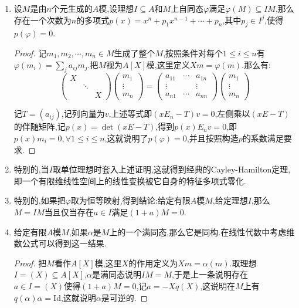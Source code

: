 \begin{enumerate}
	\item 设$M$是由$n$个元生成的$A$模,设理想$I\subseteq A$和$M$上自同态$\varphi$满足$\varphi(M)\subseteq IM$,那么存在一个次数为$n$的多项式$p(x)=x^n+p_1x^{n-1}+\cdots+p_n$,其中$p_j\in I^j$,使得$p(\varphi)=0$.
	\begin{proof}
		
		记$m_1,m_2,\cdots,m_n\in M$生成了整个$M$,按照条件对每个$1\le i\le n$有$\varphi(m_i)=\sum_ja_{ij}m_j$.把$M$视为$A[X]$模,这里定义$Xm=\varphi(m)$.那么有:
		$$\left(\begin{array}{ccc}X&&\\&\ddots&\\&&X\end{array}\right)
		\left(\begin{array}{c}m_1\\\vdots\\m_n\end{array}\right)
		=\left(\begin{array}{ccc}a_{11}&\cdots&a_{1n}\\\vdots&&\vdots\\a_{n1}&\cdots&a_{nn}\end{array}\right)\left(\begin{array}{c}m_1\\\vdots\\m_n\end{array}\right)$$
		
		记$T=(a_{ij})$,记列向量为$v$,上述等式即$(xE_n-T)v=0$,左侧乘以$(xE-T)$的伴随矩阵,记$p(x)=\det(xE-T)$,得到$p(x)E_nv=0$,即$p(x)m_i=0,\forall 1\le i\le n$,这就说明了$p(\varphi)=0$,并且按照构造$p$的系数满足要求.
	\end{proof}
	\item 特别的,当$I$取单位理想时套入上述证明,这就得到经典的Cayley-Hamilton定理,即一个有限维线性空间上的线性变换被它自身的特征多项式零化.
	\item 特别的,如果把$\varphi$取为恒等映射,得到结论:给定有限$A$模$M$,给定理想$I$,那么$M=IM$当且仅当存在$a\in I$满足$(1+a)M=0$.
	\item 给定有限$A$模$M$,如果$\alpha$是$M$上的一个满同态,那么它是同构.在线性代数中考虑维数公式可以得到这一结果.
	\begin{proof}
		
		把$M$看作$A[X]$模,这里$X$的作用定义为$Xm=\alpha(m)$.取理想$I=(X)\subseteq A[X]$,$\alpha$是满同态说明$IM=M$,于是上一条说明存在$a\in I=(X)$使得$(1+a)M=0$,记$a=-Xq(X)$,这说明在$M$上有$q(\alpha)\alpha=\mathrm{Id}$,这就说明$\alpha$是可逆的.
	\end{proof}
\end{enumerate}
